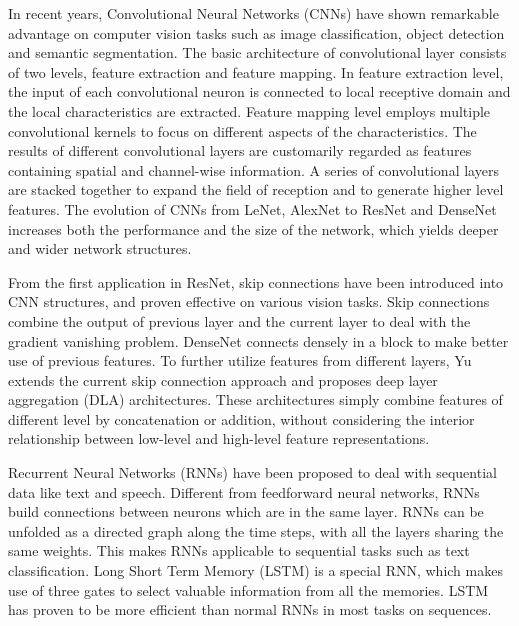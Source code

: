 \documentclass[runningheads]{llncs}
\begin{document}
In recent years, Convolutional Neural Networks (CNNs) have shown remarkable advantage on computer vision tasks such as image classification\cite{imagenet}, object detection\cite{faster-r-cnn} and semantic segmentation\cite{refinenet}. The basic architecture of convolutional layer consists of two levels, feature extraction and feature mapping. In feature extraction level, the input of each convolutional neuron is connected to local receptive domain and the local characteristics are extracted. Feature mapping level employs multiple convolutional kernels to focus on different aspects of the characteristics. The results of different convolutional layers are customarily regarded as features containing spatial and channel-wise information. A series of convolutional layers are stacked together to expand the field of reception and to generate higher level features. The evolution of CNNs from LeNet\cite{lenet}, AlexNet\cite{alexnet} to ResNet\cite{resnet} and DenseNet\cite{densenet} increases both the performance and the size of the network, which yields deeper and wider network structures.

From the first application in ResNet\cite{resnet}, skip connections have been introduced into CNN structures, and proven effective on various vision tasks. Skip connections combine the output of previous layer and the current layer to deal with the gradient vanishing problem. DenseNet\cite{densenet} connects densely in a block to make better use of previous features. To further utilize features from different layers, Yu\cite{dla} extends the current skip connection approach and proposes deep layer aggregation (DLA) architectures. These architectures simply combine features of different level by concatenation or addition, without considering the interior relationship between low-level and high-level feature representations. 

Recurrent Neural Networks (RNNs)\cite{rnn} have been proposed to deal with sequential data like text and speech. Different from feedforward neural networks, RNNs build connections between neurons which are in the same layer. RNNs can be unfolded as a directed graph along the time steps, with all the layers sharing the same weights. This makes RNNs applicable to sequential tasks such as text classification. Long Short Term Memory (LSTM)\cite{lstm} is a special RNN, which makes use of three gates to select valuable information from all the memories. LSTM has proven to be more efficient than normal RNNs in most tasks on sequences.
\end{document}
